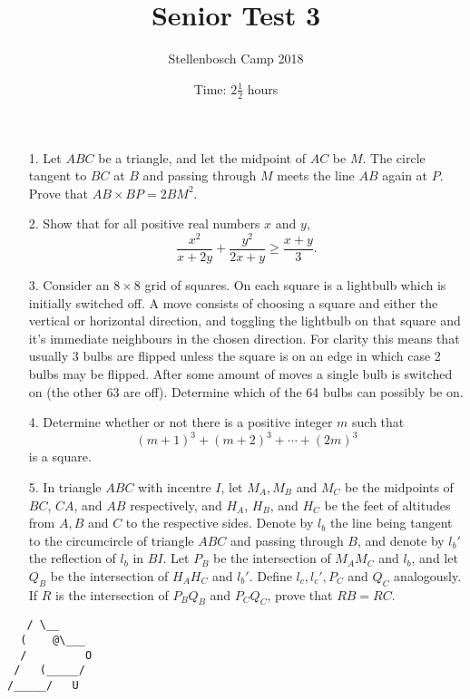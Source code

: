 \documentclass[a4paper, 12pt]{article}
\title{Senior Test 3}
\author{Stellenbosch Camp 2018}
\date{Time: $2 \frac{1}{2}$ hours}
\begin{document}
 \maketitle

\begin{enumerate}
\item[1.] Let $ABC$ be a triangle, and let the midpoint of $AC$ be $M$. The circle tangent to $BC$ at $B$ and passing through $M$ meets the line $AB$ again at $P$. Prove that $AB \times BP = 2 BM^2$.
\vspace{7pt}

\item[2.]
Show that for all positive real numbers $x$ and $y$,
\[ \frac{x^2}{x+2y} +\frac{y^2}{2x+y} \geq \frac{x+y}{3}. \]
\vspace{7pt}

\item[3.]
Consider an $8 \times 8$ grid of squares. On each square is a lightbulb which is initially switched off. A move consists of choosing a square and either the vertical or horizontal direction, and toggling the lightbulb on that square and it's immediate neighbours in the chosen direction. For clarity this means that usually 3 bulbs are flipped unless the square is on an edge in which case 2 bulbs may be flipped. After some amount of moves a single bulb is switched on (the other 63 are off). Determine which of the 64 bulbs can possibly be on. 
\vspace{7pt}

\item[4.]
Determine whether or not there is a positive integer $m$ such that \[ (m+1)^3 +(m+2)^3 +\dotsb +(2m)^3 \] is a square.


\vspace{7pt}

\item[5.]  In triangle $ABC$ with incentre $I$, let $M_A, M_B$ and $M_C$ be the midpoints of $BC$, $CA$, and $AB$ respectively, and $H_A$, $H_B$, and $H_C$ be the feet of altitudes from $A, B$ and $C$ to the respective sides. Denote by $l_b$ the line being tangent to the circumcircle of triangle $ABC$ and passing through $B$, and denote by $l_b'$ the reflection of $l_b$ in $BI$. Let $P_B$ be the intersection of $M_A M_C$ and $l_b$, and let $Q_B$ be the intersection of $H_A H_C$ and $l_b'$. Define $l_c, l_c', P_C$ and $Q_C$ analogously. If $R$ is the intersection of $P_B Q_B$ and $P_C Q_C$, prove that $RB = RC$.

\end{enumerate}

\vfill

\centering
\begin{BVerbatim}
   / \__
  (    @\___
  /         O
 /   (_____/
/_____/   U
\end{BVerbatim}

\vspace{12mm}
\end{document}
